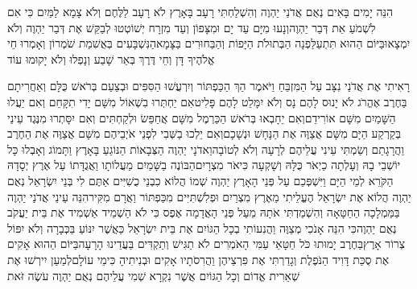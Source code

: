 \documentclass[../main/main.tex]{subfiles}
\begin{document}
\begin{multicols*}{\ncols}
הִנֵּה יָמִים בָּאִים נְאֻם אֲדֹנַי יַהְוֶה וְהִשְׁלַחְתִּי רָעָב בָּאָרֶץ לֹא רָעָב לַלֶּחֶם וְלֹא צָמָא לַמַּיִם כִּי אִם לִשְׁמֹעַ אֵת דְּבַר\SubEnd{} יַהְוֶה\PreVerseSpace{}וְנָעוּ מִיָּם עַד יָם וּמִצָּפוֹן וְעַד מִזְרָח יְשׁוֹטְטוּ לְבַקֵּשׁ אֶת דְּבַר יַהְוֶה וְלֹא יִמְצָאוּ\PreVerseSpace{}בַּיּוֹם הַהוּא תִּתְעַלַּפְנָה הַבְּתוּלֹת הַיָּפוֹת וְהַבַּחוּרִים בַּצָּמָא\PreVerseSpace{}הַנִּשְׁבָּעִים בְּאֲשִׁמַת\SubEnd{} שֹׁמְרוֹן וְאָמְרוּ חֵי אֱלֹהֶיךָ דָּן וְחֵי דֶּרֶךְ בְּאֵר שָׁבַע וְנָפְלוּ וְלֹא יָקוּמוּ עוֹד\OpenSection{}\par
{}רָאִיתִי אֶת אֲדֹנַי נִצָּב עַל הַמִּזְבֵּחַ וַיֹּאמֶר הַךְ הַכַּפְתּוֹר וְיִרְעֲשׁוּ הַסִּפִּים וּבְצַעַם בְּרֹאשׁ כֻּלָּם וְאַחֲרִיתָם בַּחֶרֶב אֶהֱרֹג לֹא יָנוּס לָהֶם נָס וְלֹא יִמָּלֵט לָהֶם פָּלִיט\PreVerseSpace{}אִם יַחְתְּרוּ בִשְׁאוֹל מִשָּׁם יָדִי תִקָּחֵם וְאִם יַעֲלוּ הַשָּׁמַיִם מִשָּׁם אוֹרִידֵם\PreVerseSpace{}וְאִם יֵחָבְאוּ בְּרֹאשׁ הַכַּרְמֶל מִשָּׁם אֲחַפֵּשׂ וּלְקַחְתִּים וְאִם יִסָּתְרוּ מִנֶּגֶד עֵינַי בְּקַרְקַע הַיָּם מִשָּׁם אֲצַוֶּה אֶת הַנָּחָשׁ וּנְשָׁכָם\PreVerseSpace{}וְאִם יֵלְכוּ בַשְּׁבִי לִפְנֵי אֹיְבֵיהֶם מִשָּׁם אֲצַוֶּה אֶת הַחֶרֶב וַהֲרָגָתַם וְשַׂמְתִּי עֵינִי עֲלֵיהֶם לְרָעָה וְלֹא לְטוֹבָה\PreVerseSpace{}וַאדֹנָי יַהְוֶה הַצְּבָאוֹת הַנּוֹגֵעַ בָּאָרֶץ וַתָּמוֹג וְאָבְלוּ כָּל יוֹשְׁבֵי בָהּ וְעָלְתָה כַיְאֹר כֻּלָּהּ וְשָׁקְעָה כִּיאֹר מִצְרָיִם\PreVerseSpace{}הַבּוֹנֶה בַשָּׁמַיִם מַעֲלוֹתָו וַאֲגֻדָּתוֹ עַל אֶרֶץ יְסָדָהּ הַקֹּרֵא לְמֵי הַיָּם וַיִּשְׁפְּכֵם עַל פְּנֵי הָאָרֶץ יַהְוֶה שְׁמוֹ \ClosedSection{}הֲלוֹא כִבְנֵי כֻשִׁיִּים אַתֶּם לִי בְּנֵי יִשְׂרָאֵל נְאֻם יַהְוֶה הֲלוֹא אֶת יִשְׂרָאֵל הֶעֱלֵיתִי מֵאֶרֶץ מִצְרַיִם וּפְלִשְׁתִּיִּים מִכַּפְתּוֹר וַאֲרָם מִקִּיר\PreVerseSpace{}הִנֵּה עֵינֵי אֲדֹנַי יַהְוֶה בַּמַּמְלָכָה הַחַטָּאָה וְהִשְׁמַדְתִּי אֹתָהּ מֵעַל פְּנֵי הָאֲדָמָה אֶפֶס כִּי לֹא הַשְׁמֵיד אַשְׁמִיד אֶת בֵּית יַעֲקֹב נְאֻם יַהְוֶה\PreVerseSpace{}כִּי הִנֵּה אָנֹכִי מְצַוֶּה וַהֲנִעוֹתִי בְכָל הַגּוֹיִם אֶת בֵּית יִשְׂרָאֵל כַּאֲשֶׁר יִנּוֹעַ בַּכְּבָרָה וְלֹא יִפּוֹל צְרוֹר אָרֶץ\PreVerseSpace{}בַּחֶרֶב יָמוּתוּ כֹּל חַטָּאֵי עַמִּי הָאֹמְרִים לֹא תַגִּישׁ וְתַקְדִּים בַּעֲדֵינוּ הָרָעָה\PreVerseSpace{}בַּיּוֹם הַהוּא אָקִים אֶת סֻכַּת דָּוִיד הַנֹּפֶלֶת וְגָדַרְתִּי אֶת פִּרְצֵיהֶן וַהֲרִסֹתָיו אָקִים וּבְנִיתִיהָ כִּימֵי עוֹלָם\PreVerseSpace{}לְמַעַן יִירְשׁוּ אֶת שְׁאֵרִית אֱדוֹם וְכָל הַגּוֹיִם אֲשֶׁר נִקְרָא שְׁמִי עֲלֵיהֶם נְאֻם יַהְוֶה עֹשֶׂה זֹּאת\OpenSection{}\par

\end{multicols*}
\end{document}
